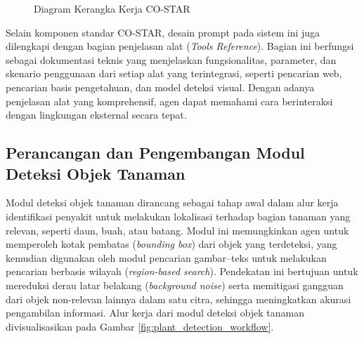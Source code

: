 \begin{figure}[H]
    \centering
    \caption{Diagram Kerangka Kerja CO-STAR}
    \label{fig:costar_framework}
\end{figure}

Selain komponen standar CO-STAR, desain prompt pada sistem ini juga dilengkapi dengan bagian penjelasan alat (\textit{Tools Reference}). Bagian ini berfungsi sebagai dokumentasi teknis yang menjelaskan fungsionalitas, parameter, dan skenario penggunaan dari setiap alat yang terintegrasi, seperti pencarian web, pencarian basis pengetahuan, dan model deteksi visual. Dengan adanya penjelasan alat yang komprehensif, agen dapat memahami cara berinteraksi dengan lingkungan eksternal secara tepat.

\subsection{Perancangan dan Pengembangan Modul Deteksi Objek Tanaman}
Modul deteksi objek tanaman dirancang sebagai tahap awal dalam alur kerja identifikasi penyakit untuk melakukan lokalisasi terhadap bagian tanaman yang relevan, seperti daun, buah, atau batang. Modul ini memungkinkan agen untuk memperoleh kotak pembatas (\textit{bounding box}) dari objek yang terdeteksi, yang kemudian digunakan oleh modul pencarian gambar–teks untuk melakukan pencarian berbasis wilayah (\textit{region-based search}). Pendekatan ini bertujuan untuk mereduksi derau latar belakang (\textit{background noise}) serta memitigasi gangguan dari objek non-relevan lainnya dalam satu citra, sehingga meningkatkan akurasi pengambilan informasi.  Alur kerja dari modul deteksi objek tanaman divisualisasikan pada Gambar \ref{fig:plant_detection_workflow}.

